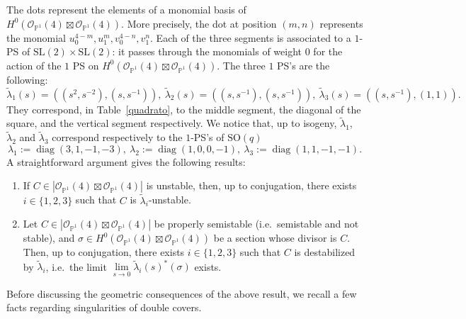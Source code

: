 \documentclass[11pt]{amsart}
\numberwithin{equation}{section}
\theoremstyle{plain}
\theoremstyle{remark}
\theoremstyle{definition}
\newcommand{\SL}{\mathrm{SL}}
\newcommand{\SO}{\mathrm{SO}}
\newcommand{\cO}{{\mathscr O}}
\newcommand{\PP}{{\mathbb P}}
\newcommand{\wt}{\widetilde}
\DeclareMathOperator{\diag}{diag}
\begin{document}
The dots represent the elements of a monomial basis of $H^0(\cO_{\PP^1}(4)\boxtimes\cO_{\PP^1}(4))$. More precisely, the dot at position $(m,n)$ represents the monomial  $u^{4-m}_0,u^m_1,v^{4-n}_0,v^n_1$.  Each of the three segments is associated to a  $1$-PS  of $\SL(2)\times\SL(2)$: it passes through the monomials of weight $0$ for the action of the $1$ PS  on $H^0(\cO_{\PP^1}(4)\boxtimes\cO_{\PP^1}(4))$.
The three $1$ PS's are the following:
%
\begin{equation*}
%
\wt{\lambda}_1(s)=((s^2,s^{-2}),(s,s^{-1})),\ \wt{\lambda}_2(s)=((s,s^{-1}),(s,s^{-1})),\ \wt{\lambda}_3(s)=((s,s^{-1}),(1,1)). 
%
\end{equation*}
%
They correspond, in  Table~\ref{quadrato}, to the middle segment, the diagonal of the square, and the vertical segment respectively.
We notice that, up to isogeny, $\wt{\lambda}_1$, $\wt{\lambda}_2$ and $\wt{\lambda}_3$ correspond respectively to the  $1$-PS's of  $\SO(q)$ 
%
\begin{equation}\label{1234}
%
\lambda_1:=\diag(3,1,-1,-3),\ \lambda_2:=\diag(1,0,0,-1), \ \lambda_3:=\diag(1,1,-1,-1). 
%
\end{equation}
%
A straightforward argument gives the following results:
%
\begin{enumerate}
%
\item
%
If  $C\in | \cO_{\PP^1}(4)\boxtimes\cO_{\PP^1}(4)|$ is unstable, then, up to conjugation, there exists $i\in\{1,2,3\}$ such that $C$ is $\wt{\lambda}_i$-unstable.  
%
\item
%
Let  $C\in | \cO_{\PP^1}(4)\boxtimes\cO_{\PP^1}(4)|$ be properly semistable (i.e.~semistable and not stable), and $\sigma\in H^0(\cO_{\PP^1}(4)\boxtimes\cO_{\PP^1}(4))$ be a section whose divisor is $C$. Then, up to conjugation, there exists $i\in\{1,2,3\}$ such that $C$ is destabilized by $\wt{\lambda}_i$, i.e.~the limit $\lim\limits_{s\to 0}\wt{\lambda}_i(s)^{*}(\sigma)$ exists. 
% 
\end{enumerate}
%
Before discussing the geometric consequences of the above result, we recall a few facts regarding singularities of double covers.
%
\end{document}
